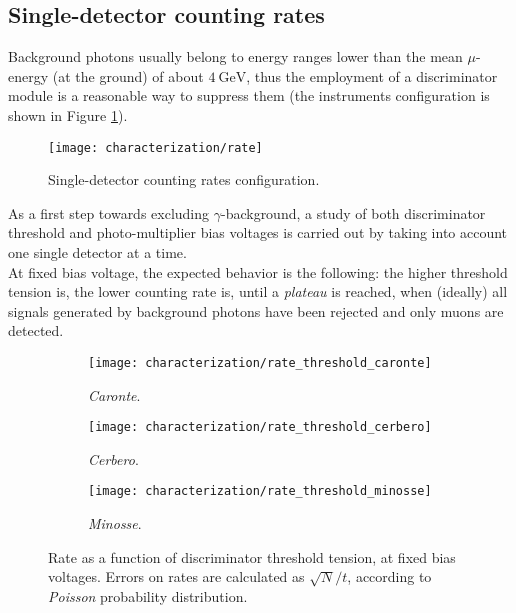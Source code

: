 \subsection{Single-detector counting rates}
Background photons usually belong to energy ranges lower than the mean $\mu$-energy (at the ground) of about $\SI{4}{\giga\electronvolt}$, thus the employment of a discriminator module is a reasonable way to suppress them (the instruments configuration is shown in Figure \ref{fig:single-rate}).
\begin{figure}[!h]
	\centering
	\texttt{[image: characterization/rate]}
	\caption{Single-detector counting rates configuration.}
	\label{fig:single-rate}
\end{figure}

As a first step towards excluding $\gamma$-background, a study of both discriminator threshold and photo-multiplier bias voltages is carried out by taking into account one single detector at a time.\\

At fixed bias voltage, the expected behavior is the following: the higher threshold tension is, the lower counting rate is, until a \emph{plateau} is reached, when (ideally) all signals generated by background photons have been rejected and only muons are detected.\\
\begin{figure}[!htp]
	\centering
	\begin{subfigure}{.5\linewidth}
		\centering
		\texttt{[image: characterization/rate\_threshold\_caronte]}
		\caption{\emph{Caronte}.} 
		\label{subfig:rt_caronte}
	\end{subfigure}\hfill
	\begin{subfigure}{.5\linewidth}
		\centering
		\texttt{[image: characterization/rate\_threshold\_cerbero]}
		\caption{\emph{Cerbero}.} 
		\label{subfig:rt_cerbero}
	\end{subfigure}\hfill
	\begin{subfigure}{\linewidth}
		\centering
		\texttt{[image: characterization/rate\_threshold\_minosse]}
		\caption{\emph{Minosse}.} 
		\label{subfig:rt_minosse}
	\end{subfigure}
	\caption{Rate as a function of discriminator threshold tension, at fixed bias voltages. Errors on rates are calculated as $\sqrt{N}/t$, according to \emph{Poisson} probability distribution.} 
	\label{fig:rt}
\end{figure}


